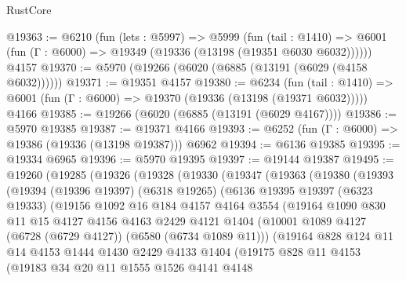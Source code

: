 \begin{lexlean}{RustCore}
\begin{coremodule}
@19363 := @6210
    (fun (lets : @5997) =>
    @5999
      (fun (tail : @1410) =>
      @6001 (fun (Γ : @6000) => @19349 (@19336 (@13198 (@19351 @6030 @6032))))))
    @4157
@19370 := @5970 (@19266 (@6020 (@6885 (@13191 (@6029 (@4158 @6032))))))
@19371 := @19351 @4157
@19380 := @6234
    (fun (tail : @1410) => @6001 (fun (Γ : @6000) => @19370 (@19336 (@13198 (@19371 @6032)))))
    @4166
@19385 := @19266 (@6020 (@6885 (@13191 (@6029 @4167))))
@19386 := @5970 @19385
@19387 := @19371 @4166
@19393 := @6252 (fun (Γ : @6000) => @19386 (@19336 (@13198 @19387))) @6962
@19394 := @6136 @19385
@19395 := @19334 @6965
@19396 := @5970 @19395
@19397 := @19144 @19387
@19495 := @19260
    (@19285
      (@19326
        (@19328
          (@19330
            (@19347
              (@19363
                (@19380
                  (@19393
                    (@19394
                      (@19396 @19397)
                      (@6318 @19265)
                      (@6136
                        @19395
                        @19397
                        (@6323 @19333)
                        (@19156
                          @1092
                          @16
                          @184
                          @4157
                          @4164
                          @3554
                          (@19164
                            @1090
                            @830
                            @11
                            @15
                            @4127
                            @4156
                            @4163
                            @2429
                            @4121
                            @1404
                            (@10001 @1089 @4127 (@6728 (@6729 @4127)) (@6580 (@6734 @1089 @11)))
                            (@19164
                              @828
                              @124
                              @11
                              @14
                              @4153
                              @1444
                              @1430
                              @2429
                              @4133
                              @1404
                              (@19175
                                @828
                                @11
                                @4153
                                (@19183
                                  @34
                                  @20
                                  @11
                                  @1555
                                  @1526
                                  @4141
                                  @4148

\end{coremodule}
\end{lexlean}
